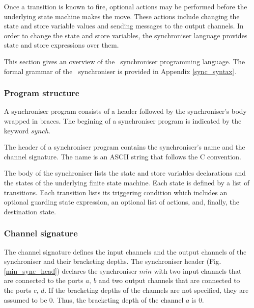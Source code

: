 Once a transition is known to fire, optional actions may be performed before the underlying state machine makes the move. These actions include changing the state and store variable values and sending messages to the output channels. In order to change the state and store variables, the synchroniser language provides state and store expressions over them.

This section gives an overview of the \ak\ synchroniser programming language. The formal grammar of the \ak\ synchroniser is provided in Appendix \ref{sync_syntax}.

  \subsubsection{Program structure}
A synchroniser program consists of a header followed by the synchroniser's body wrapped in braces. The begining of a synchroniser program is indicated by the keyword $synch$.

The header of a synchroniser program contains the synchroniser's name and the channel signature. The name is an ASCII string that follows the C convention.

The body of the synchroniser lists the state and store variables declarations and the states of the underlying finite state machine. Each state is defined by a list of transitions. Each transition lists its triggering condition which includes an optional guarding state expression, an optional list of actions, and, finally, the destination state.


  \subsubsection{Channel signature}
The channel signature defines the input channels and the output channels of the synchroniser and their bracketing depths. The synchroniser header (Fig. \ref{min_sync_head}) declares the synchroniser $min$ with two input channels that are connected to the ports $a$, $b$ and two output channels that are connected to the ports $c$, $d$. If the bracketing depths of the channels are not specified, they are assumed to be 0. Thus, the bracketing depth of the channel $a$ is 0.

